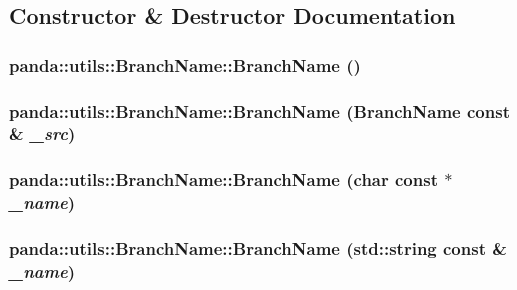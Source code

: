 \subsection{Constructor \& Destructor Documentation}
\hypertarget{classpanda_1_1utils_1_1BranchName_a3d8fc79b18dd73ecea8371172636645a}{
\subsubsection[{BranchName}]{\setlength{\rightskip}{0pt plus 5cm}panda::utils::BranchName::BranchName ()}}
\label{classpanda_1_1utils_1_1BranchName_a3d8fc79b18dd73ecea8371172636645a}
\hypertarget{classpanda_1_1utils_1_1BranchName_a4ff9e5c6eb5053ff32fcb84d672988fa}{
\subsubsection[{BranchName}]{\setlength{\rightskip}{0pt plus 5cm}panda::utils::BranchName::BranchName ({\bf BranchName} const \& {\em \_\-src})}}
\label{classpanda_1_1utils_1_1BranchName_a4ff9e5c6eb5053ff32fcb84d672988fa}
\hypertarget{classpanda_1_1utils_1_1BranchName_ad3b6e846348eb19a2c4ff2bb371b3525}{
\subsubsection[{BranchName}]{\setlength{\rightskip}{0pt plus 5cm}panda::utils::BranchName::BranchName (char const $\ast$ {\em \_\-name})}}
\label{classpanda_1_1utils_1_1BranchName_ad3b6e846348eb19a2c4ff2bb371b3525}
\hypertarget{classpanda_1_1utils_1_1BranchName_a8a4d8f841d091b236e16059cc6458d28}{
\subsubsection[{BranchName}]{\setlength{\rightskip}{0pt plus 5cm}panda::utils::BranchName::BranchName (std::string const \& {\em \_\-name})}}
\label{classpanda_1_1utils_1_1BranchName_a8a4d8f841d091b236e16059cc6458d28}


